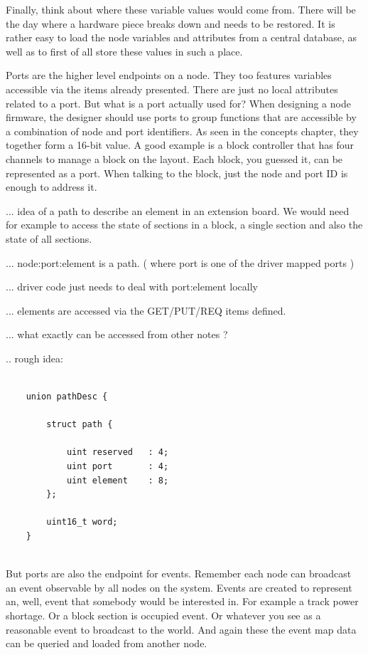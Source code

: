 Finally, think about where these variable values would come from. There will be the day where a hardware piece breaks down and needs to be restored. It is rather easy to load the node variables and attributes from a central database, as well as to first of all store these values in such a place.


Ports are the higher level endpoints on a node. They too features variables accessible via the items already presented. There are just no local attributes related to a port. But what is a port actually used for? When designing a node firmware, the designer should use ports to group functions that are accessible by a combination of node and port identifiers. As seen in the concepts chapter, they together form a 16-bit value. A good example is a block controller that has four channels to manage a block on the layout. Each block, you guessed it, can be represented as a port. When talking to the block, just the node and port ID is enough to address it.

... idea of a path to describe an element in an extension board. We would need for example to access the state of sections in a block, a single section and also the state of all sections.

... node:port:element is a path. ( where port is one of the driver mapped ports )

... driver code just needs to deal with port:element locally

... elements are accessed via the GET/PUT/REQ items defined. 

... what exactly can be accessed from other notes ?

.. rough idea:

\lstset{language=c++, style=codesnippetstyle}
\begin{lstlisting}
   
    union pathDesc { 

        struct path {

            uint reserved   : 4;
            uint port       : 4;
            uint element    : 8;
        };

        uint16_t word;
    }
    
\end{lstlisting}


But ports are also the endpoint for events. Remember each node can broadcast an event observable by all nodes on the system. Events are created to represent an, well, event that somebody would be interested in. For example a track power shortage. Or a block section is occupied event. Or whatever you see as a reasonable event to broadcast to the world. And again these the event map data can be queried and loaded from another node.

